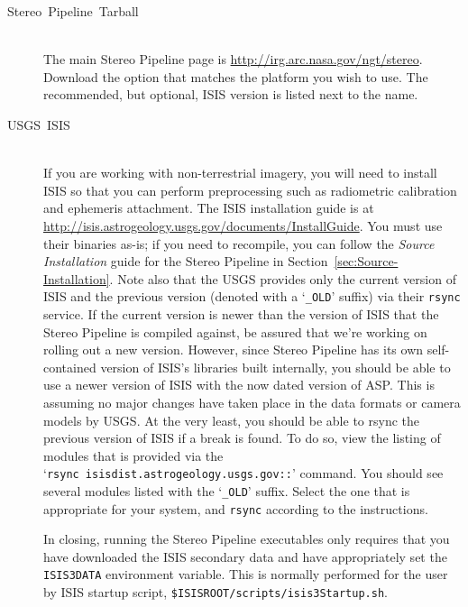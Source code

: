 \begin{description}
\item [{Stereo~Pipeline~Tarball}] \hspace*{\fill} \\
The main Stereo Pipeline page is
\url{http://irg.arc.nasa.gov/ngt/stereo}.  Download the option that
matches the platform you wish to use. The recommended, but
optional, \ac{ISIS} version is listed next to the name.

\item [{USGS~ISIS}] \hspace*{\fill} \\
If you are working with non-terrestrial imagery, you will need to install
\ac{ISIS} so that you can perform preprocessing such as radiometric
calibration and ephemeris attachment. The \ac{ISIS} installation guide is at
\url{http://isis.astrogeology.usgs.gov/documents/InstallGuide}.  You
must use their binaries as-is; if you need to recompile, you can
follow the \emph{Source Installation} guide for the Stereo Pipeline in
Section~\ref{sec:Source-Installation}.  Note also that the \ac{USGS}
provides only the current version of \ac{ISIS} and the previous
version (denoted with a `\texttt{\_OLD}' suffix) via their
\texttt{rsync} service. If the current version is newer than the
version of ISIS that the Stereo Pipeline is compiled against, be
assured that we're working on rolling out a new version. However,
since Stereo Pipeline has its own self-contained version of ISIS's
libraries built internally, you should be able to use a newer version
of ISIS with the now dated version of \ac{ASP}. This is assuming no major
changes have taken place in the data formats or camera models by
\ac{USGS}. At the very least, you should be able to rsync the previous
version of ISIS if a break is found.  To do so, view the listing of
modules that is provided via the
`\texttt{rsync~isisdist.astrogeology.usgs.gov::}' command.  You should
see several modules listed with the `\texttt{\_OLD}' suffix.  Select
the one that is appropriate for your system, and \texttt{rsync}
according to the instructions.

In closing, running the Stereo Pipeline executables only requires that
you have downloaded the ISIS secondary data and have appropriately set
the \texttt{ISIS3DATA} environment variable. This is normally
performed for the user by ISIS startup script,
\texttt{\$ISISROOT/scripts/isis3Startup.sh}.

\end{description}

